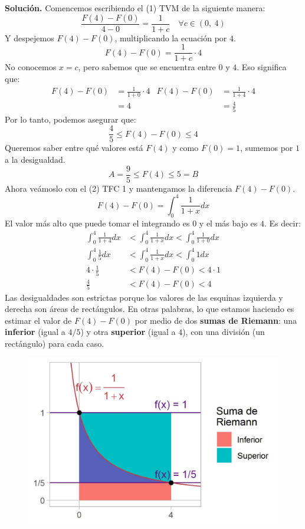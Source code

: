 \documentclass[12pt]{article}
\begin{document}
\textbf{Solución.} \quad Comencemos escribiendo el (1) TVM de la siguiente manera:
\[
  \frac{F(4) - F(0)}{4 - 0} = \frac{1}{1 + c} \quad \forall c \in (0, \ 4)
\]
Y despejemos $F(4) - F(0)$, multiplicando la ecuación por $4$.
\[
  F(4) - F(0) = \frac{1}{1 + c} \cdot 4
\]
No conocemos $x = c$, pero sabemos que se encuentra entre $0$ y $4$. Eso significa que:
\begin{align*}
F(4) - F(0) &= \frac{1}{1 + 0} \cdot 4 & F(4) - F(0) &= \frac{1}{1 + 4} \cdot 4 \\
            &= 4                       &             &= \frac{4}{5}
\end{align*}
Por lo tanto, podemos asegurar que:
\[
  \frac{4}{5} \leq F(4) - F(0) \leq 4
\]
Queremos saber entre qué valores está $F(4)$ y como $F(0) = 1$, sumemos por $1$ a la desigualdad.
\[
  A = \frac{9}{5} \leq F(4) \leq 5 = B
\]
Ahora veámoslo con el (2) TFC 1 y mantengamos la diferencia $F(4) - F(0)$.
\[
  F(4) - F(0) = \int_{0}^{4} \frac{1}{1 + x} dx
\]
El valor más alto que puede tomar el integrando es $0$ y el más bajo es $4$. Es decir:
\begin{align*}
\int_{0}^{4} \frac{1}{1 + 4} dx &< \int_{0}^{4} \frac{1}{1 + x} dx < \int_{0}^{4} \frac{1}{1 + 0} dx \\
\int_{0}^{4} \frac{1}{5} dx &< \int_{0}^{4} \frac{1}{1 + x} dx < \int_{0}^{4} 1 dx \\
4 \cdot \frac{1}{5} &< F(4) - F(0) < 4 \cdot 1 \\
\frac{4}{5} &< F(4) - F(0) < 4
\end{align*}
Las desigualdades son estrictas porque los valores de las esquinas izquierda y derecha son áreas de rectángulos. En otras palabras, lo que estamos haciendo es estimar el valor de $F(4) - F(0)$ por medio de dos \textbf{sumas de Riemann}: una \textbf{inferior} (igual a $4/5$) y otra \textbf{superior} (igual a $4$), con una división (un rectángulo) para cada caso.

\begin{figure}[hbt!]
\centering
\includegraphics[scale=0.7]{img/tvm_tfc1_example.jpg}
\end{figure}
\end{document}

